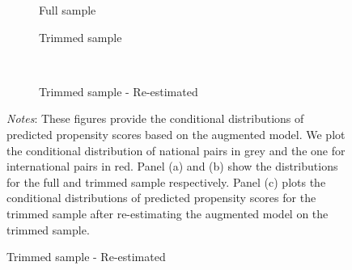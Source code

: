 \begin{figure}[H]
    \centering
    \caption{Propensity scores}
    \label{fig: app_prop_score}
    \begin{subfigure}[t]{.49\textwidth}
         \centering
         \caption{Full sample}
         \label{fig: app_prop_score_full}
         \scalebox{0.45}{}
     \end{subfigure}
     \begin{subfigure}[t]{.49\textwidth}
         \centering
         \caption{Trimmed sample}
         \label{fig: app_prop_score_trimmed}
         \scalebox{0.45}{}
     \end{subfigure}\\
     \begin{subfigure}[t]{.49\textwidth}
         \centering
         \caption{Trimmed sample - Re-estimated}
         \label{fig: app_prop_score_trimmed_re}
         \scalebox{0.45}{}
     \end{subfigure}
     \parbox{\textwidth}{
        \begin{spacing}{1} 
            {\footnotesize 
            \textit{Notes}: These figures provide the conditional distributions of predicted propensity scores based on the augmented model. We plot the conditional distribution of national pairs in grey and the one for international pairs in red. Panel (a) and (b) show the distributions for the full and trimmed sample respectively. Panel (c) plots the conditional distributions of predicted propensity scores for the trimmed sample after re-estimating the augmented model on the trimmed sample.}
        \end{spacing}}
 \end{figure} 



